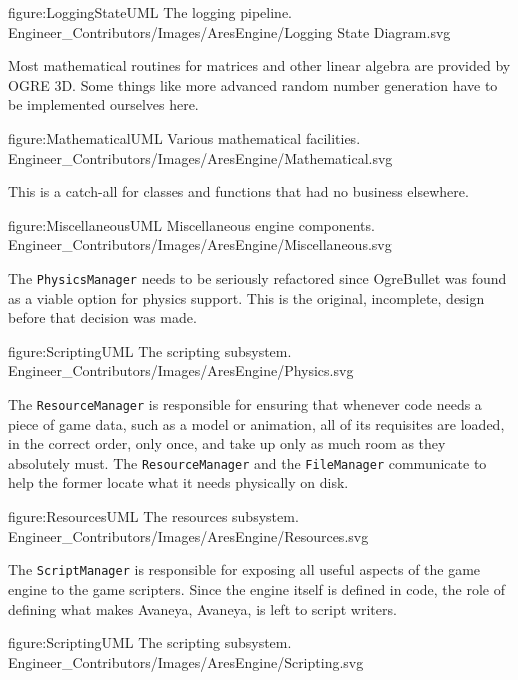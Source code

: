 \FullPageDiagram
    {figure:LoggingStateUML}
    {The logging pipeline.}
    {Engineer_Contributors/Images/AresEngine/Logging State Diagram.svg}

\page 
{}
Most mathematical routines for matrices and other linear algebra are provided by OGRE 3D. Some things like more advanced random number generation have to be implemented ourselves here.

\FullPageDiagram
    {figure:MathematicalUML}
    {Various mathematical facilities.}
    {Engineer_Contributors/Images/AresEngine/Mathematical.svg}

\page 
{}
This is a catch-all for classes and functions that had no business elsewhere.

\FullPageDiagram
    {figure:MiscellaneousUML}
    {Miscellaneous engine components.}
    {Engineer_Contributors/Images/AresEngine/Miscellaneous.svg}

\page 
{}
The {\tt PhysicsManager} needs to be seriously refactored since OgreBullet was found as a viable option for physics support. This is the original, incomplete, design before that decision was made.

\FullPageDiagram
    {figure:ScriptingUML}
    {The scripting subsystem.}
    {Engineer_Contributors/Images/AresEngine/Physics.svg}

\page 
{}
The {\tt ResourceManager} is responsible for ensuring that whenever code needs a piece of game data, such as a model or animation, all of its requisites are loaded, in the correct order, only once, and take up only as much room as they absolutely must. The {\tt ResourceManager} and the {\tt FileManager} communicate to help the former locate what it needs physically on disk.

\FullPageDiagram
    {figure:ResourcesUML}
    {The resources subsystem.}
    {Engineer_Contributors/Images/AresEngine/Resources.svg}

\page 
{}
The {\tt ScriptManager} is responsible for exposing all useful aspects of the game engine to the game scripters. Since the engine itself is defined in code, the role of defining what makes Avaneya, Avaneya, is left to script writers.

\FullPageDiagram
    {figure:ScriptingUML}
    {The scripting subsystem.}
    {Engineer_Contributors/Images/AresEngine/Scripting.svg}

